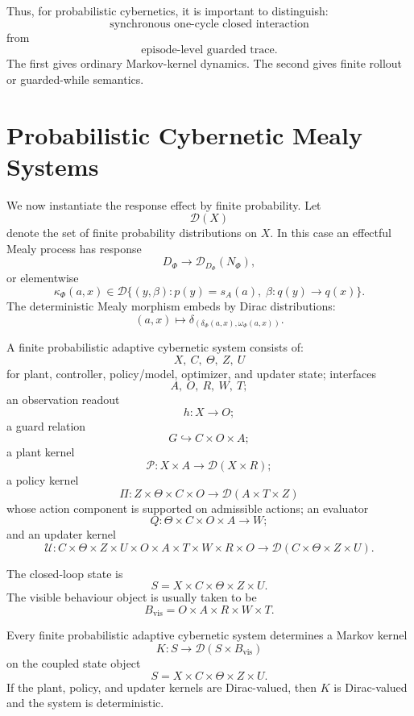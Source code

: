 Thus, for probabilistic cybernetics, it is important to distinguish:
\[
\text{synchronous one-cycle closed interaction}
\]
from
\[
\text{episode-level guarded trace}.
\]
The first gives ordinary Markov-kernel dynamics.  The second gives finite rollout or guarded-while
semantics.

\section{Probabilistic Cybernetic Mealy Systems}
\label{sec:probabilistic-cybernetic-mealy-systems}

We now instantiate the response effect by finite probability.  Let
\[
\mathcal D(X)
\]
denote the set of finite probability distributions on \(X\).  In this case an effectful Mealy
process has response
\[
D_\Phi\to \mathcal D_{D_\Phi}(N_\Phi),
\]
or elementwise
\[
\kappa_\Phi(a,x)
\in
\mathcal D
\{(y,\beta):p(y)=s_A(a),\;\beta:q(y)\to q(x)\}.
\]
The deterministic Mealy morphism embeds by Dirac distributions:
\[
(a,x)\mapsto
\delta_{(\delta_\Phi(a,x),\omega_\Phi(a,x))}.
\]

\begin{definition}
\label{def:finite-probabilistic-adaptive-cybernetic-system}
A finite probabilistic adaptive cybernetic system consists of:
\[
X,\ C,\ \Theta,\ Z,\ U
\]
for plant, controller, policy/model, optimizer, and updater state;
interfaces
\[
A,\ O,\ R,\ W,\ T;
\]
an observation readout
\[
h:X\to O;
\]
a guard relation
\[
G\hookrightarrow C\times O\times A;
\]
a plant kernel
\[
\mathcal P:X\times A\to \mathcal D(X\times R);
\]
a policy kernel
\[
\Pi:Z\times\Theta\times C\times O\to \mathcal D(A\times T\times Z)
\]
whose action component is supported on admissible actions;
an evaluator
\[
Q:\Theta\times C\times O\times A\to W;
\]
and an updater kernel
\[
\mathcal U:
C\times\Theta\times Z\times U
\times O\times A\times T\times W\times R\times O
\to
\mathcal D(C\times\Theta\times Z\times U).
\]
\end{definition}

The closed-loop state is
\[
S=X\times C\times\Theta\times Z\times U.
\]
The visible behaviour object is usually taken to be
\[
B_{\mathrm{vis}}=O\times A\times R\times W\times T.
\]

\begin{theorem}
\label{thm:closed-loop-markov-kernel}
Every finite probabilistic adaptive cybernetic system determines a Markov kernel
\[
K:S\to \mathcal D(S\times B_{\mathrm{vis}})
\]
on the coupled state object
\[
S=X\times C\times\Theta\times Z\times U.
\]
If the plant, policy, and updater kernels are Dirac-valued, then \(K\) is Dirac-valued and the
system is deterministic.
\end{theorem}

